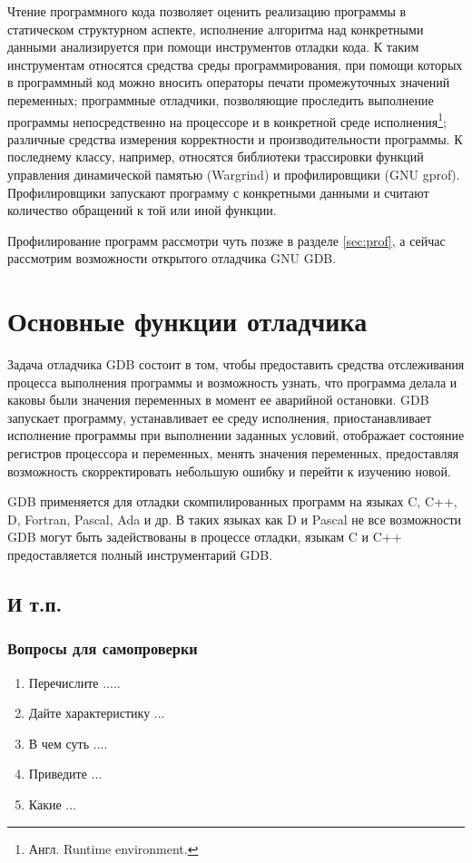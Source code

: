 \documentclass[14pt, a4paper, openany, twoside, final]{extbook} %
\newenvironment{questions}{\subsubsection*{Вопросы для самопроверки}\begin{enumerate}\itemsep0pt minus 0.3pt\parskip0pt plus 0.3pt}{\end{enumerate}}
\begin{document}
Чтение программного кода позволяет оценить реализацию программы в статическом структурном аспекте, исполнение алгоритма над конкретными данными анализируется при помощи инструментов отладки кода.  К таким инструментам относятся средства среды программирования, при помощи которых в программный код можно вносить операторы печати промежуточных значений переменных; программные отладчики, позволяющие проследить выполнение программы непосредственно на процессоре и в конкретной среде исполнения\footnote{Англ. Runtime environment.}; различные средства измерения корректности и производительности программы.  К последнему классу, например, относятся библиотеки трассировки функций управления динамической памятью (Wargrind) и профилировщики (GNU gprof).  Профилировщики запускают программу с конкретными данными и считают количество обращений к той или иной функции.

Профилирование программ рассмотри чуть позже в разделе \ref{sec:prof},
а сейчас рассмотрим возможности открытого отладчика GNU GDB.

\section{Основные функции отладчика}

Задача отладчика GDB состоит в том, чтобы предоставить средства отслеживания процесса выполнения программы и возможность узнать, что программа делала и каковы были значения переменных в момент ее аварийной остановки.  GDB запускает программу, устанавливает ее среду исполнения, приостанавливает исполнение программы при выполнении заданных условий, отображает состояние регистров процессора и переменных, менять значения переменных, предоставляя возможность скорректировать небольшую ошибку и перейти к изучению новой.

GDB применяется для отладки скомпилированных программ на языках C, C++, D, Fortran, Pascal, Ada и др.  В таких языках как D и Pascal не все возможности GDB могут быть задействованы в процессе отладки, языкам C и C++ предоставляется полный инструментарий GDB.

\subsection{И т.п.}


\begin{questions}
\item{} Перечислите .....
\item{} Дайте характеристику ...
\item{} В чем суть ....
\item{} Приведите ...
\item{} Какие ...
\end{questions}
\end{document}
